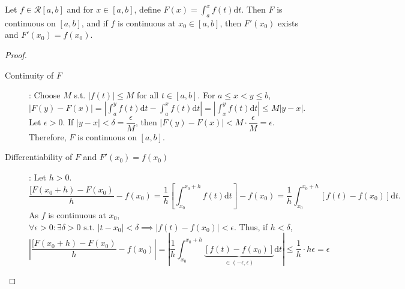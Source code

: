 \begin{thm}[20]
	Let $f \in \mathscr{R}[a,b]$ and for $x \in [a,b]$, define $F(x)= \int_{a}^{x}{f(t)\mathrm{d}t}$. Then $F$ is continuous on $[a,b]$, and if $f$ is continuous at $x_0 \in [a,b]$, then $F'(x_0)$ exists and $F'(x_0)=f(x_0)$.\\
	\begin{proof}
		\begin{description}
			\item[Continuity of $F$]:
			      Choose $M$ s.t. $\left|f(t)\right|\le M$ for all $t \in [a,b]$.
			      For $a\le x<y\le b$, $\left|F(y)-F(x)\right|=\left|\int_{a}^{y}{f(t)\mathrm{d}t}- \int_{a}^{x}{f(t)\mathrm{d}t}\right|= \left|\int_{x}^{y}{f(t)\mathrm{d}t}\right|\le M \left|y-x\right|$.
			      Let $\epsilon>0$. If $\left|y-x\right|<\delta=\dfrac{\epsilon}{M}$, then $\left|F(y)-F(x)\right|<M\cdot \dfrac{\epsilon}{M} = \epsilon$. Therefore, $F$ is continuous on $[a,b]$.
			\item[Differentiability of $F$ and $F'(x_0)=f(x_0)$]: Let $h>0$.
			      \[
				      \dfrac{[F(x_0+h)-F(x_0)}{h}-f(x_0)=\dfrac{1}{h}\left[\int_{x_0}^{x_0+h}{f(t)\mathrm{d}t}\right]-f(x_0)=\dfrac{1}{h} \int_{x_0}^{x_0+h}{[f(t)-f(x_0)]\mathrm{d}t}
				      .\]
			      As $f$ is continuous at $x_0$, $\forall{\epsilon > 0}: \exists{\delta > 0} \text{ s.t. } \left|t-x_0\right|< \delta \implies \left|f(t)-f(x_0)\right| < \epsilon$. Thus, if $h<\delta$,
			      \[
				      \left|\dfrac{[F(x_0+h)-F(x_0)}{h}-f(x_0)\right|= \left|\dfrac{1}{h} \int_{x_0}^{x_0+h}{\underbrace{\left[f(t)-f(x_0)\right] }_{ \in (-\epsilon,\epsilon)}\mathrm{d}t}\right|\le \dfrac{1}{h} \cdot h \epsilon=\epsilon
			      \]
		\end{description}
	\end{proof}
\end{thm}

